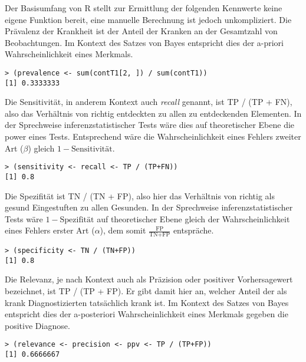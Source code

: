 Der Basisumfang von R stellt zur Ermittlung der folgenden Kennwerte keine eigene Funktion bereit, eine manuelle Berechnung ist jedoch unkompliziert. Die Prävalenz der Krankheit ist der Anteil der Kranken an der Gesamtzahl von Beobachtungen. Im Kontext des Satzes von Bayes entspricht dies der a-priori Wahrscheinlichkeit eines Merkmals.
\begin{lstlisting}
> (prevalence <- sum(contT1[2, ]) / sum(contT1))
[1] 0.3333333
\end{lstlisting}

Die Sensitivität, in anderem Kontext auch \emph{recall} genannt, ist TP / (TP + FN), also das Verhältnis von richtig entdeckten zu allen zu entdeckenden Elementen. In der Sprechweise inferenzstatistischer Tests wäre dies auf theoretischer Ebene die power eines Tests. Entsprechend wäre die Wahrscheinlichkeit eines Fehlers zweiter Art ($\beta$) gleich $1-\text{Sensitivität}$.
\begin{lstlisting}
> (sensitivity <- recall <- TP / (TP+FN))
[1] 0.8
\end{lstlisting}

Die Spezifität ist TN / (TN + FP), also hier das Verhältnis von richtig als gesund Eingestuften zu allen Gesunden. In der Sprechweise inferenzstatistischer Tests wäre $1 - \text{Spezifität}$ auf theoretischer Ebene gleich der Wahrscheinlichkeit eines Fehlers erster Art ($\alpha$), dem somit $\frac{\text{FP}}{\text{TN} + \text{FP}}$ entspräche.
\begin{lstlisting}
> (specificity <- TN / (TN+FP))
[1] 0.8
\end{lstlisting}

Die Relevanz, je nach Kontext auch als Präzision oder positiver Vorhersagewert bezeichnet, ist TP / (TP + FP). Er gibt damit hier an, welcher Anteil der als krank Diagnostizierten tatsächlich krank ist. Im Kontext des Satzes von Bayes entspricht dies der a-posteriori Wahrscheinlichkeit eines Merkmals gegeben die positive Diagnose.
\begin{lstlisting}
> (relevance <- precision <- ppv <- TP / (TP+FP))
[1] 0.6666667
\end{lstlisting}

